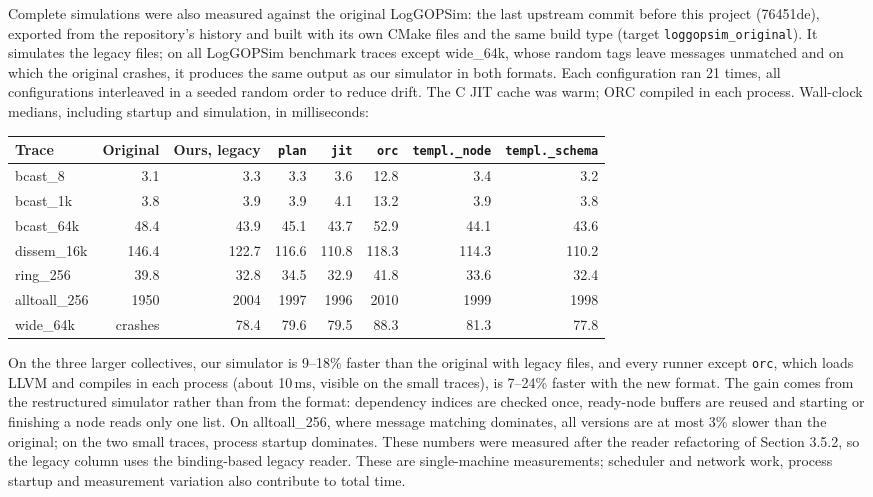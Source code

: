 \documentclass[10pt,a4paper]{article}
\begin{document}
Complete simulations were also measured against the original LogGOPSim: the last upstream commit before this project (76451de), exported from the repository's history and built with its own CMake files and the same build type (target \texttt{loggopsim\_\allowbreak{}original}). It simulates the legacy files; on all LogGOPSim benchmark traces except wide\_64k, whose random tags leave messages unmatched and on which the original crashes, it produces the same output as our simulator in both formats. Each configuration ran 21 times, all configurations interleaved in a seeded random order to reduce drift. The C JIT cache was warm; ORC compiled in each process. Wall-clock medians, including startup and simulation, in milliseconds:

\begin{center}
\small
\setlength{\tabcolsep}{4pt}
\begin{tabular}{lrrrrrrr}
\toprule
\textbf{Trace} & \textbf{Original} & \textbf{Ours, legacy} & \texttt{plan} & \texttt{jit} & \texttt{orc} & \texttt{templ.\_node} & \texttt{templ.\_schema} \\
\midrule
bcast\_8 & 3.1 & 3.3 & 3.3 & 3.6 & 12.8 & 3.4 & 3.2 \\
bcast\_1k & 3.8 & 3.9 & 3.9 & 4.1 & 13.2 & 3.9 & 3.8 \\
bcast\_64k & 48.4 & 43.9 & 45.1 & 43.7 & 52.9 & 44.1 & 43.6 \\
dissem\_16k & 146.4 & 122.7 & 116.6 & 110.8 & 118.3 & 114.3 & 110.2 \\
ring\_256 & 39.8 & 32.8 & 34.5 & 32.9 & 41.8 & 33.6 & 32.4 \\
alltoall\_256 & 1950 & 2004 & 1997 & 1996 & 2010 & 1999 & 1998 \\
wide\_64k & crashes & 78.4 & 79.6 & 79.5 & 88.3 & 81.3 & 77.8 \\
\bottomrule
\end{tabular}
\end{center}

On the three larger collectives, our simulator is 9--18\% faster than the original with legacy files, and every runner except \texttt{orc}, which loads LLVM and compiles in each process (about 10\,ms, visible on the small traces), is 7--24\% faster with the new format. The gain comes from the restructured simulator rather than from the format: dependency indices are checked once, ready-node buffers are reused and starting or finishing a node reads only one list. On alltoall\_256, where message matching dominates, all versions are at most 3\% slower than the original; on the two small traces, process startup dominates. These numbers were measured after the reader refactoring of Section 3.5.2, so the legacy column uses the binding-based legacy reader. These are single-machine measurements; scheduler and network work, process startup and measurement variation also contribute to total time.
\end{document}
